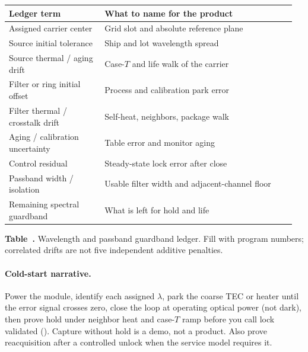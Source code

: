 \begin{table}[ht]
\label{tab:wdm-guardband}%
\centering
\setlength{\tabcolsep}{3pt}%
\footnotesize
\renewcommand{\arraystretch}{1.25}%
\begin{tabular}{@{}p{0.32\linewidth}p{0.64\linewidth}@{}}
\toprule
Ledger term & What to name for the product \\
\midrule
Assigned carrier center & Grid slot and absolute reference plane \\
\addlinespace[1.0em]
Source initial tolerance & Ship and lot wavelength spread \\
\addlinespace[1.0em]
Source thermal / aging drift & Case-$T$ and life walk of the carrier \\
\addlinespace[1.0em]
Filter or ring initial offset & Process and calibration park error \\
\addlinespace[1.0em]
Filter thermal / crosstalk drift & Self-heat, neighbors, package walk \\
\addlinespace[1.0em]
Aging / calibration uncertainty & Table error and monitor aging \\
\addlinespace[1.0em]
Control residual & Steady-state lock error after close \\
\addlinespace[1.0em]
Passband width / isolation & Usable filter width and adjacent-channel floor \\
\addlinespace[1.0em]
Remaining spectral guardband & What is left for hold and life \\
\bottomrule
\end{tabular}
\par\medskip
{\raggedright\footnotesize\textbf{Table~\thetable.} Wavelength and passband
guardband ledger. Fill with program numbers; correlated drifts are not five
independent additive penalties.\par}
\end{table}

\paragraph{Cold-start narrative.}
Power the module, identify each assigned $\lambda$, park the coarse TEC or
heater until the error signal crosses zero, close the loop at operating optical
power (not dark), then prove hold under neighbor heat and case-$T$ ramp before
you call lock validated (). Capture without hold is
a demo, not a product. Also prove reacquisition after a controlled unlock when
the service model requires it.

